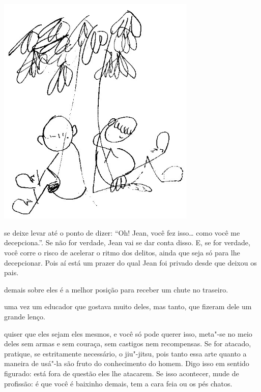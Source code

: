 \begin{vplace}[.50]
\begin{center}
\includegraphics[width=95mm]{./imgs/Image_8.jpg}
\end{center}
\end{vplace}

\pagebreak
\thispagestyle{empty}
\movetooddpage

 se deixe levar até o ponto de dizer: ``Oh! Jean, você fez isso\ldots{}
como você me decepciona.''. Se não for verdade, Jean vai se dar conta
disso. E, se for verdade, você corre o risco de acelerar o ritmo dos
delitos, ainda que seja só para lhe decepcionar. Pois aí está um prazer
do qual Jean foi privado desde que deixou os pais.

\bigskip
\bigskip

 demais sobre eles é a melhor posição para receber um chute
no traseiro.

\bigskip
\bigskip

 uma vez um educador que gostava muito deles, mas tanto, que fizeram
dele um grande lenço.

\bigskip
\bigskip

 quiser que eles sejam eles mesmos, e você só pode querer isso,
meta"-se no meio deles sem armas e sem couraça, sem castigos nem
recompensas. Se for atacado, pratique, se estritamente necessário, o
jiu"-jitsu, pois tanto essa arte quanto a maneira de usá"-la são fruto do
conhecimento do homem. Digo isso em sentido figurado: está fora de
questão eles lhe atacarem. Se isso acontecer, mude de profissão: é que
você é baixinho demais, tem a cara feia ou os pés chatos.

